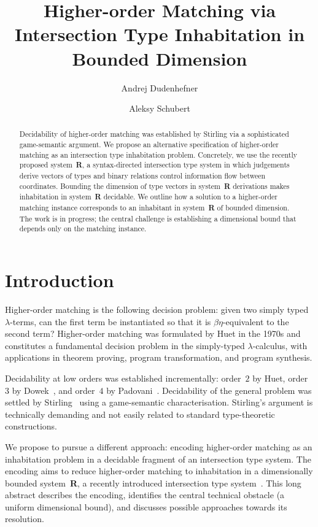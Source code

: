 \documentclass{easychair}
\title{Higher-order Matching via Intersection Type Inhabitation in Bounded Dimension}
\author{
Andrej Dudenhefner\inst{1}
\and
Aleksy Schubert\inst{2}
}
\institute{
TU Dortmund University, Germany\\
\email{andrej.dudenhefner@cs.tu-dortmund.de}
\and
University of Warsaw, Poland\\
\email{alx@mimuw.edu.pl}
}
\theoremstyle{plain}%
\renewcommand{\:}{\mbox{:}\xspace}
\begin{document}
\maketitle

\begin{abstract}
Decidability of higher-order matching was established by Stirling via a sophisticated game-semantic argument.
We propose an alternative specification of higher-order matching as an intersection type inhabitation problem.
Concretely, we use the recently proposed system~\textbf{R}, a syntax-directed intersection type system in which judgements derive vectors of types and binary relations control information flow between coordinates.
Bounding the dimension of type vectors in system~\textbf{R} derivations makes inhabitation in system~\textbf{R} decidable.
We outline how a solution to a higher-order matching instance corresponds to an inhabitant in system~\textbf{R} of bounded dimension.
The work is in progress; the central challenge is establishing a dimensional bound that depends only on the matching instance.
\end{abstract}

\section{Introduction}
\label{sect:introduction}

Higher-order matching is the following decision problem: given two simply typed $\lambda$-terms, can the first term be instantiated so that it is $\beta\eta$-equivalent to the second term?
Higher-order matching was formulated by Huet in the 1970s and constitutes a fundamental decision problem in the simply-typed $\lambda$-calculus, with applications in theorem proving, program transformation, and program synthesis.

Decidability at low orders was established incrementally: order~$2$ by Huet, order~$3$ by Dowek~\cite{dowek1992}, and order~$4$ by Padovani~\cite{padovani2000}.
Decidability of the general problem was settled by Stirling~\cite{stirling2009} using a game-semantic characterisation.
Stirling's argument is technically demanding and not easily related to standard type-theoretic constructions.

\medskip

We propose to pursue a different approach: encoding higher-order matching as an inhabitation problem in a decidable fragment of an intersection type system.
The encoding aims to reduce higher-order matching to inhabitation in a dimensionally bounded system~\textbf{R}, a recently introduced intersection type system~\cite{dsr2026sysR}.
This long abstract describes the encoding, identifies the central technical obstacle (a uniform dimensional bound), and discusses possible approaches towards its resolution.
\end{document}
